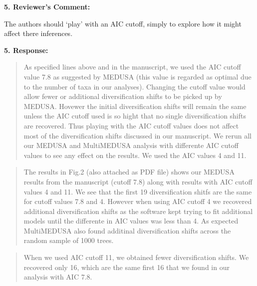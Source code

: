 \documentclass[]{article}
\begin{document}
\textbf{5. Reviewer's Comment:}

The authors should `play' with an AIC cutoff, simply to explore how it
might affect there inferences.

\textbf{5. Response:}

\begin{quote}
\color{blue}
As specified lines above and in the manuscript, we used the AIC cutoff
value 7.8 as suggested by MEDUSA (this value is regarded as optimal due
to the number of taxa in our analyses). Changing the cutoff value would
allow fewer or additional diversification shifts to be picked up by
MEDUSA. Hovewer the initial diversification shifts will remain the same
unless the AIC cutoff used is so hight that no single diversification
shifts are recovered. Thus playing with the AIC cutoff values does not
affect most of the diversification shifts discussed in our manuscript.
We rerun all our MEDUSA and MultiMEDUSA analysis with differente AIC
cutoff values to see any effect on the results. We used the AIC values 4
and 11.
\end{quote}

\begin{quote}
\color{blue}
The results in Fig.2 (also attached as PDF file) shows our MEDUSA
results from the manuscript (cutoff 7.8) along with results with AIC
cutoff values 4 and 11. We see that the first 19 diversification shitfs
are the same for cutoff values 7.8 and 4. However when using AIC cutoff
4 we recovered additional diversification shifts as the software kept
trying to fit additional models until the differente in AIC values was
less than 4. As expected MultiMEDUSA also found additinal
diversification shifts across the random sample of 1000 trees.
\end{quote}

\begin{quote}
\color{blue}
When we used AIC cutoff 11, we obtained fewer diversification shifts. We
recovered only 16, which are the same first 16 that we found in our
analysis with AIC 7.8.
\end{quote}
\end{document}
